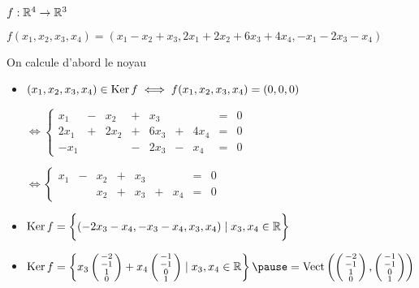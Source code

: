 \begin{frame}
\begin{exemple}
$f : \mathbb{R}^4 \rightarrow  \mathbb{R}^3$

$f(x_1,x_2,x_3,x_4)=(x_1-x_2+x_3,2x_1+2x_2+6x_3+4x_4,-x_1-2x_3-x_4)$

\smallskip
\pause
{} On calcule d'abord le noyau
\pause
{\small
\begin{itemize}
  \item   $(x_1,x_2,x_3,x_4) \in \mathop{\text{Ker}}\nolimits f \iff f(x_1,x_2,x_3,x_4) = (0,0,0)$
\pause

  $\iff \left\{ 
  \begin{array}{cccccccccc}
   x_1  &-& x_2  &+& x_3  & &      &=& 0 \\
   2x_1 &+& 2x_2 &+& 6x_3 &+& 4x_4 &=& 0 \\
   -x_1 & &      &-& 2x_3 &-& x_4  &=& 0 
  \end{array}\right.$

\pause  
  $\iff \left\{ 
  \begin{array}{cccccccccc}
   x_1  &-& x_2  &+& x_3  & &      &=& 0 \\
        & & x_2  &+& x_3  &+& x_4  &=& 0 
  \end{array}  \right.$

  \vspace*{-1ex}
\pause
 
  \item $\mathop{\text{Ker}}\nolimits f = \bigg\{ (-2x_3-x_4,-x_3-x_4,x_3,x_4) \mid x_3,x_4 \in \mathbb{R}\bigg\}$
  
  \vspace*{-1ex}
  
\pause  
  \item $\Ker f  = \left\{ x_3 \left(\begin{smallmatrix}-2 \\-1 \\1 \\0 \end{smallmatrix}\right)
  + x_4 \left(\begin{smallmatrix}-1\\-1\\0\\1 \end{smallmatrix}\right)\mid x_3,x_4 \in \Rr \right\}
\pause  = \Vect \left( \left(\begin{smallmatrix}-2 \\-1 \\1 \\0 \end{smallmatrix}\right),
  \left(\begin{smallmatrix}-1\\-1\\0\\1 \end{smallmatrix}\right)
  \right) $


\end{itemize}}
\end{exemple}
\end{frame}
